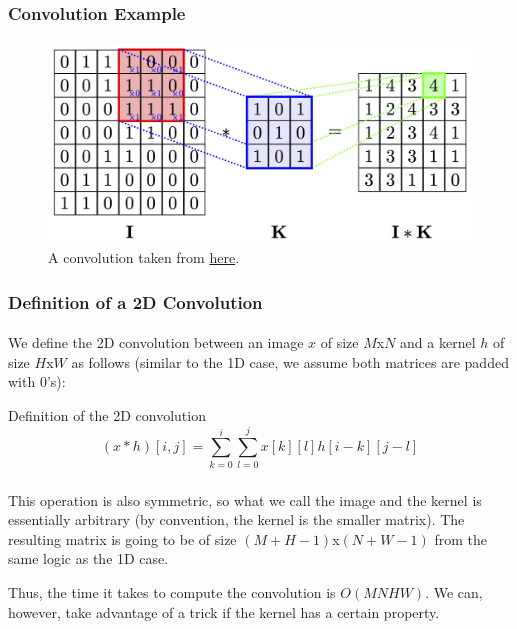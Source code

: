 \documentclass{beamer}                             %
\begin{document}
\begin{frame}
\frametitle{Convolution Example}
\framesubtitle{}
\begin{figure}[h!]
  \centering
  \includegraphics[scale=1]{conv.png}
  \caption{A convolution taken from \href{https://petar-v.com/GAT/}{here}.}
\end{figure}
\end{frame}

\begin{frame}
\frametitle{Definition of a 2D Convolution}
\framesubtitle{}
We define the 2D convolution between an image \( x \) of size \( M \)x\( N \)
and a kernel \( h \) of size \( H \)x\( W \) as follows
(similar to the 1D case, we assume both matrices are padded with 0's):
\begin{alertblock}{Definition of the 2D convolution}
  \[ (x * h)[i, j] = \sum^i_{k = 0} \sum^j_{l = 0} x[k][l]h[i - k][j - l] \]
\end{alertblock}
\end{frame}

\begin{frame}
\frametitle{}
\framesubtitle{}
This operation is also symmetric, so  what we call the image and the kernel
is essentially arbitrary (by convention, the kernel is the smaller matrix).
The resulting matrix is going to be of size \( (M + H - 1) \)x\( (N + W - 1) \)
from the same logic as the 1D case. \pause 

Thus, the time it takes to compute the convolution is \( O(MNHW) \).
We can, however, take advantage of a trick if the kernel has a certain property.
\end{frame}
\end{document}
